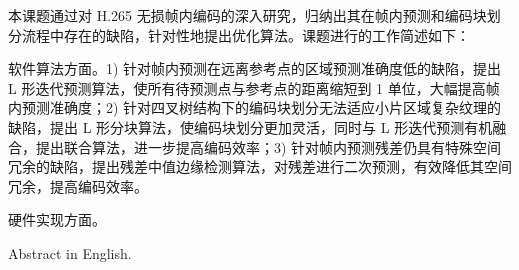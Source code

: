\begin{cabstract}
    
    本课题通过对 H.265 无损帧内编码的深入研究，归纳出其在帧内预测和编码块划分流程中存在的缺陷，针对性地提出优化算法。课题进行的工作简述如下：

    软件算法方面。1) 针对帧内预测在远离参考点的区域预测准确度低的缺陷，提出 L 形迭代预测算法，使所有待预测点与参考点的距离缩短到 1 单位，大幅提高帧内预测准确度；2) 针对四叉树结构下的编码块划分无法适应小片区域复杂纹理的缺陷，提出 L 形分块算法，使编码块划分更加灵活，同时与 L 形迭代预测有机融合，提出联合算法，进一步提高编码效率；3) 针对帧内预测残差仍具有特殊空间冗余的缺陷，提出残差中值边缘检测算法，对残差进行二次预测，有效降低其空间冗余，提高编码效率。

    硬件实现方面。
\end{cabstract}


\begin{eabstract}
    Abstract in English.
\end{eabstract}

